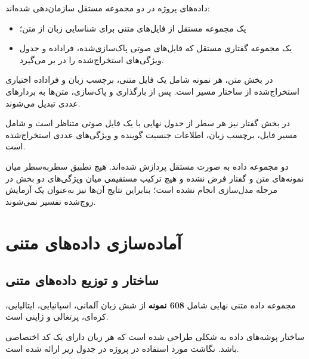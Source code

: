 داده‌های پروژه در دو مجموعه مستقل سازمان‌دهی شده‌اند:

\begin{itemize}

	\item یک مجموعه مستقل از فایل‌های متنی برای شناسایی زبان از متن؛

	\item یک مجموعه گفتاری مستقل که فایل‌های صوتی پاک‌سازی‌شده، فراداده و جدول ویژگی‌های استخراج‌شده را در بر می‌گیرد.

\end{itemize}

در بخش متن، هر نمونه شامل یک فایل متنی، برچسب زبان و فراداده اختیاری استخراج‌شده از ساختار مسیر است. پس از بارگذاری و پاک‌سازی، متن‌ها به بردارهای عددی تبدیل می‌شوند.

در بخش گفتار نیز هر سطر از جدول نهایی با یک فایل صوتی متناظر است و شامل مسیر فایل، برچسب زبان، اطلاعات جنسیت گوینده و ویژگی‌های عددی استخراج‌شده است.

دو مجموعه داده به صورت مستقل پردازش شده‌اند. هیچ تطبیق سطربه‌سطر میان نمونه‌های متن و گفتار فرض نشده و هیچ ترکیب مستقیمی میان ویژگی‌های دو بخش در مرحله مدل‌سازی انجام نشده است؛ بنابراین نتایج آن‌ها نیز به‌عنوان یک آزمایش زوج‌شده تفسیر نمی‌شوند.


\section{آماده‌سازی داده‌های متنی}


\subsection{ساختار و توزیع داده‌های متنی}

مجموعه داده متنی نهایی شامل
\textbf{608 نمونه}
از شش زبان آلمانی، اسپانیایی، ایتالیایی، کره‌ای، پرتغالی و ژاپنی است.

ساختار پوشه‌های داده به شکلی طراحی شده است که هر زبان دارای یک کد اختصاصی باشد. نگاشت مورد استفاده در پروژه در جدول زیر ارائه شده است.

